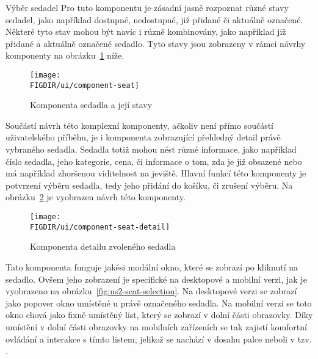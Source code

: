 \begin{subsection}{Výběr sedadel}
    Pro tuto komponentu je zásadní jasně rozpoznat různé stavy sedadel, jako například dostupné, nedostupné, již přidané či aktuálně označené.
    Některé tyto stav mohou být navíc i různě kombinovány, jako například již přidané a aktuálně označené sedadlo.
    Tyto stavy jsou zobrazeny v rámci návrhy komponenty  na obrázku~\ref{fig:component-seat} níže.

    \begin{figure}[H]
        \centering
        \caption{Komponenta sedadla a její stavy}
        \texttt{[image: \\FIGDIR/ui/component-seat]}
        \source{}
        \label{fig:component-seat}
    \end{figure}

    Součástí návrh této komplexní komponenty, ačkoliv není přímo součástí uživatelského příběhu, je i komponenta zobrazující přehledný detail právě vybraného sedadla.
    Sedadla totiž mohou nést různé informace, jako například číslo sedadla, jeho kategorie, cena, či informace o tom, zda je již obsazené nebo má například zhoršenou viditelnost na jeviště.
    Hlavní funkcí této komponenty je potvrzení výběru sedadla, tedy jeho přidání do košíku, či zrušení výběru.
    Na obrázku~\ref{fig:component-seat-} je vyobrazen návrh této komponenty.

    \begin{figure}[H]
        \centering
        \caption{Komponenta detailu zvoleného sedadla}
        \texttt{[image: \\FIGDIR/ui/component-seat-detail]}
        \source{}
        \label{fig:component-seat-}
    \end{figure}

    Tato komponenta funguje jakési modální okno, které se zobrazí po kliknutí na sedadlo.
    Ovšem jeho zobrazení je specifické na desktopové a mobilní verzi, jak je vyobrazeno na obrázku~\ref{fig:us2-seat-selection}.
    Na desktopové verzi se zobrazí jako popover okno umístěné u právě označeného sedadla.
    Na mobilní verzi se toto okno chová jako fixně umístěný list, který se zobrazí v dolní části obrazovky.
    Díky umístění v dolní části obrazovky na mobilních zařízeních se tak zajistí komfortní ovládání a interakce s tímto listem, jelikož se nachází v dosahu palce neboli v tzv. .
\end{subsection}
\pagebreak

